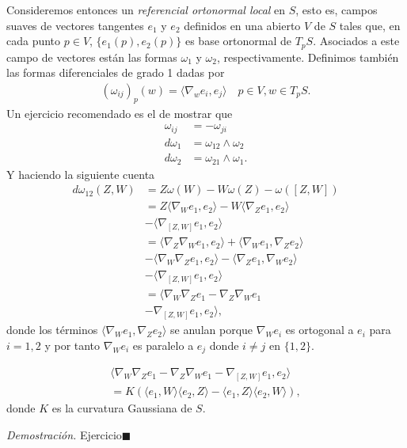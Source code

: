 \documentclass[oneside,11pt]{memoir}
\begin{document}
Consideremos entonces un \textit{referencial ortonormal local} en $S$, esto es, campos suaves de vectores tangentes $e_1$ y $e_2$ definidos en una abierto $V$ de $S$ tales que, en cada punto $p\in V$, $\{e_1(p),e_2(p)\}$ es base ortonormal de $T_pS$. Asociados a este campo de vectores están las formas $\omega_1$ y $\omega_2$, respectivamente. Definimos también las formas diferenciales de grado 1 dadas por
\begin{align*}
    (\omega_{ij})_p(w)=\langle \nabla_w e_i, e_j\rangle \quad p\in V, w\in T_pS.
\end{align*}
Un ejercicio recomendado es el de mostrar que
\begin{align*}
    \omega_{ij}&=-\omega_{ji}\\
    d\omega_1&=\omega_{12}\land \omega_2\\
    d\omega_2&=\omega_{21}\land \omega_1.
\end{align*}
Y haciendo la siguiente cuenta
\begin{align*}
    d\omega_{12}(Z,W)&=Z\omega(W)-W\omega(Z)-\omega([Z,W])\\
    &=Z\langle \nabla_W e_1, e_2\rangle-W\langle \nabla_Z e_1, e_2\rangle\\
    &-\langle \nabla_{[Z,W]} e_1, e_2\rangle\\
    &=\langle\nabla_Z \nabla_W e_1, e_2\rangle+\langle\nabla_W e_1, \nabla_Z e_2\rangle\\
    &-\langle\nabla_W \nabla_Z e_1, e_2\rangle-\langle\nabla_Z e_1, \nabla_W e_2\rangle\\
    &-\langle \nabla_{[Z,W]} e_1, e_2\rangle\\
    &=\langle\nabla_W \nabla_Z e_1-\nabla_Z \nabla_W e_1\\
    &-\nabla_{[Z,W]} e_1, e_2\rangle,
\end{align*}
donde los términos $\langle\nabla_W e_1, \nabla_Z e_2\rangle$ se anulan porque $\nabla_We_i$ es ortogonal a $e_i$ para $i=1,2$ y por tanto $\nabla_We_i$ es paralelo a $e_j$ donde $i\neq j$ en $\{1,2\}$.
\begin{proposition}
    \begin{align*}
        \langle\nabla_W \nabla_Z e_1-\nabla_Z \nabla_W e_1-\nabla_{[Z,W]} e_1, e_2\rangle
        \\
        =K(\langle e_1,W\rangle\langle e_2,Z\rangle-\langle e_1,Z\rangle\langle e_2,W\rangle),
    \end{align*}
    donde $K$ es la curvatura Gaussiana de $S$.
\end{proposition}
\textit{Demostración.} Ejercicio\hfill $\blacksquare$\\
\end{document}
